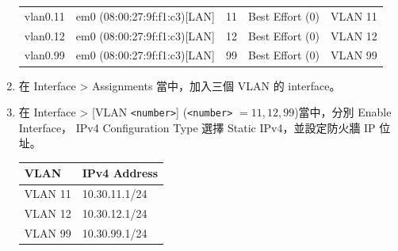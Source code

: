 \documentclass[12pt]{article}
\begin{document}
\begin{enumerate}
\begin{table}[H]
\begin{tabular}{p{2cm}p{5.5cm}p{1cm}p{3cm}p{2.5cm}}
        \midrule
        vlan0.11 & em0 (08:00:27:9f:f1:c3)[LAN] & 11 & Best Effort (0) & VLAN 11 \\
        vlan0.12 & em0 (08:00:27:9f:f1:c3)[LAN] & 12 & Best Effort (0) & VLAN 12 \\
        vlan0.99 & em0 (08:00:27:9f:f1:c3)[LAN] & 99 & Best Effort (0) & VLAN 99 \\
        \bottomrule
      \end{tabular}
    \end{table}
  \item 在 Interface > Assignments 當中，加入三個 VLAN 的 interface。
  \item 在 Interface > [VLAN \texttt{<number>}] (\texttt{<number>} $ = {11, 12, 99}$)當中，分別 {Enable Interface}， IPv4 Configuration Type 選擇 Static IPv4，並設定防火牆 IP 位址。
    \begin{table}[H]
      \centering
      \begin{tabular}{p{3cm}p{4cm}}
        \toprule
        \textbf{VLAN} & \textbf{IPv4 Address}  \\
        \midrule
        VLAN 11 & 10.30.11.1/24 \\
        VLAN 12 & 10.30.12.1/24 \\
        VLAN 99 & 10.30.99.1/24 \\
        \bottomrule
      \end{tabular}
    \end{table}
\end{enumerate}

\end{document}
